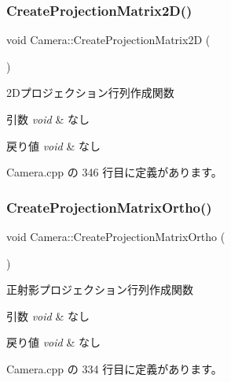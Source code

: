 \subsubsection{\texorpdfstring{Create\+Projection\+Matrix2\+D()}{CreateProjectionMatrix2D()}}
{\footnotesize\ttfamily void Camera\+::\+Create\+Projection\+Matrix2D (\begin{DoxyParamCaption}{ }\end{DoxyParamCaption})}



2\+Dプロジェクション行列作成関数 


\begin{DoxyParams}{引数}
{\em void} & なし \\
\hline
\end{DoxyParams}

\begin{DoxyRetVals}{戻り値}
{\em void} & なし \\
\hline
\end{DoxyRetVals}


 Camera.\+cpp の 346 行目に定義があります。

\mbox{\label{class_camera_aa649036ee18decc7c539ef7de2b0dff6}} 
\subsubsection{\texorpdfstring{Create\+Projection\+Matrix\+Ortho()}{CreateProjectionMatrixOrtho()}}
{\footnotesize\ttfamily void Camera\+::\+Create\+Projection\+Matrix\+Ortho (\begin{DoxyParamCaption}{ }\end{DoxyParamCaption})}



正射影プロジェクション行列作成関数 


\begin{DoxyParams}{引数}
{\em void} & なし \\
\hline
\end{DoxyParams}

\begin{DoxyRetVals}{戻り値}
{\em void} & なし \\
\hline
\end{DoxyRetVals}


 Camera.\+cpp の 334 行目に定義があります。

